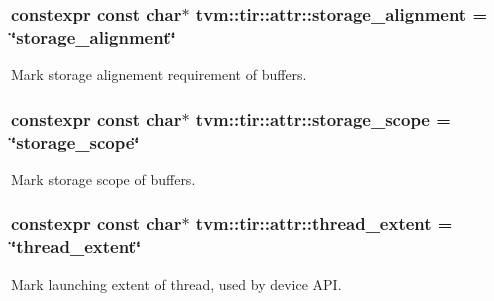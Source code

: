 \subsubsection[{\texorpdfstring{storage\+\_\+alignment}{storage_alignment}}]{\setlength{\rightskip}{0pt plus 5cm}constexpr const char$\ast$ tvm\+::tir\+::attr\+::storage\+\_\+alignment = \char`\"{}storage\+\_\+alignment\char`\"{}}\hypertarget{namespacetvm_1_1tir_1_1attr_af27d464f2065dc5f77408df7b94d4bb6}{}\label{namespacetvm_1_1tir_1_1attr_af27d464f2065dc5f77408df7b94d4bb6}


Mark storage alignement requirement of buffers. 

\subsubsection[{\texorpdfstring{storage\+\_\+scope}{storage_scope}}]{\setlength{\rightskip}{0pt plus 5cm}constexpr const char$\ast$ tvm\+::tir\+::attr\+::storage\+\_\+scope = \char`\"{}storage\+\_\+scope\char`\"{}}\hypertarget{namespacetvm_1_1tir_1_1attr_a04f015503117e6b781ade61e103b074a}{}\label{namespacetvm_1_1tir_1_1attr_a04f015503117e6b781ade61e103b074a}


Mark storage scope of buffers. 

\subsubsection[{\texorpdfstring{thread\+\_\+extent}{thread_extent}}]{\setlength{\rightskip}{0pt plus 5cm}constexpr const char$\ast$ tvm\+::tir\+::attr\+::thread\+\_\+extent = \char`\"{}thread\+\_\+extent\char`\"{}}\hypertarget{namespacetvm_1_1tir_1_1attr_a399eed804ecc482a607f0f65f07b78dd}{}\label{namespacetvm_1_1tir_1_1attr_a399eed804ecc482a607f0f65f07b78dd}


Mark launching extent of thread, used by device A\+PI. 


